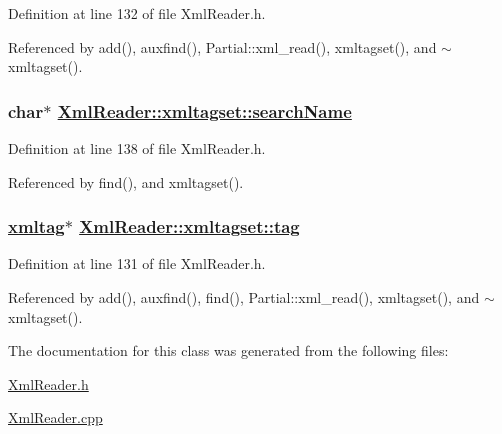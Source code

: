 Definition at line 132 of file Xml\-Reader.h.

Referenced by add(), auxfind(), Partial::xml\_\-read(), xmltagset(), and $\sim$xmltagset().\hypertarget{classXmlReader_1_1xmltagset_p1}{
\subsubsection[searchName]{\setlength{\rightskip}{0pt plus 5cm}char$\ast$ \hyperlink{classXmlReader_1_1xmltagset_p1}{Xml\-Reader::xmltagset::search\-Name}}}
\label{classXmlReader_1_1xmltagset_p1}




Definition at line 138 of file Xml\-Reader.h.

Referenced by find(), and xmltagset().\hypertarget{classXmlReader_1_1xmltagset_o0}{
\subsubsection[tag]{\setlength{\rightskip}{0pt plus 5cm}\hyperlink{classXmlReader_1_1xmltag}{xmltag}$\ast$ \hyperlink{classXmlReader_1_1xmltagset_o0}{Xml\-Reader::xmltagset::tag}}}
\label{classXmlReader_1_1xmltagset_o0}




Definition at line 131 of file Xml\-Reader.h.

Referenced by add(), auxfind(), find(), Partial::xml\_\-read(), xmltagset(), and $\sim$xmltagset().

The documentation for this class was generated from the following files:\begin{CompactItemize}
\item 
\hyperlink{XmlReader_8h}{Xml\-Reader.h}\item 
\hyperlink{XmlReader_8cpp}{Xml\-Reader.cpp}\end{CompactItemize}

